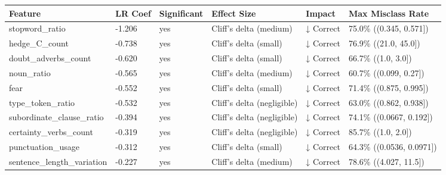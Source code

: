 \begin{tabular}{llllll}
\toprule
Feature & LR Coef & Significant & Effect Size & Impact & Max Misclass Rate \\
\midrule
stopword\_ratio & -1.206 & yes & Cliff's delta (medium) & ↓ Correct & 75.0\% ((0.345, 0.571]) \\
hedge\_C\_count & -0.738 & yes & Cliff's delta (small) & ↓ Correct & 76.9\% ((21.0, 45.0]) \\
doubt\_adverbs\_count & -0.620 & yes & Cliff's delta (small) & ↓ Correct & 66.7\% ((1.0, 3.0]) \\
noun\_ratio & -0.565 & yes & Cliff's delta (medium) & ↓ Correct & 60.7\% ((0.099, 0.27]) \\
fear & -0.552 & yes & Cliff's delta (small) & ↓ Correct & 71.4\% ((0.875, 0.995]) \\
type\_token\_ratio & -0.532 & yes & Cliff's delta (negligible) & ↓ Correct & 63.0\% ((0.862, 0.938]) \\
subordinate\_clause\_ratio & -0.394 & yes & Cliff's delta (negligible) & ↓ Correct & 74.1\% ((0.0667, 0.192]) \\
certainty\_verbs\_count & -0.319 & yes & Cliff's delta (negligible) & ↓ Correct & 85.7\% ((1.0, 2.0]) \\
punctuation\_usage & -0.312 & yes & Cliff's delta (small) & ↓ Correct & 64.3\% ((0.0536, 0.0971]) \\
sentence\_length\_variation & -0.227 & yes & Cliff's delta (medium) & ↓ Correct & 78.6\% ((4.027, 11.5]) \\
\bottomrule
\end{tabular}
